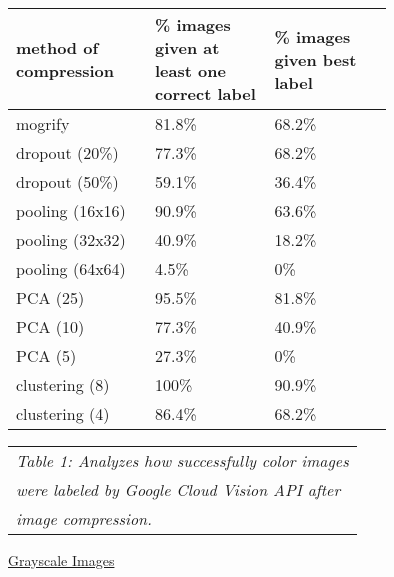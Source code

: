 \documentclass[letterpaper, 10 pt, conference]{ieeeconf}  %
\begin{document}
\bgroup
\def\arraystretch{1.2} %
\begin{tabular}{|p{0.25\linewidth}|p{0.25\linewidth}|p{0.25\linewidth}|}
\hline
{\bf method of compression} & {\bf \% images given at least one correct label}
	& {\bf \% images given best label} \\
\hline
mogrify & 81.8\% & 68.2\% \\ %
\hline
dropout (20\%) & 77.3\% & 68.2\% \\ %
\hline
dropout (50\%) & 59.1\% & 36.4\% \\ %
\hline
pooling (16x16) & 90.9\% & 63.6\% \\ %
\hline
pooling (32x32) & 40.9\% & 18.2\% \\ %
\hline
pooling (64x64) & 4.5\% & 0\% \\ %
\hline
PCA (25) & 95.5\% & 81.8\% \\ %
\hline
PCA (10) & 77.3\% & 40.9\% \\ %
\hline
PCA (5) & 27.3\% & 0\% \\ %
\hline
clustering (8) & 100\% & 90.9\% \\ %
\hline
clustering (4) & 86.4\% & 68.2\% \\ %
\hline
\end{tabular}
\egroup

\vspace*{2mm}
\begin{tabular}{l}
{\it Table 1: Analyzes how successfully color images} \\
{\it were labeled by Google Cloud Vision API after} \\
{\it image compression.} \\
\end{tabular}
\vspace*{4mm}

\vspace*{2mm}

\hspace*{28mm} \underline{Grayscale Images}

\vspace*{2mm}
\end{document}
